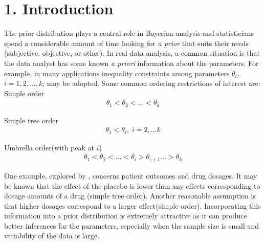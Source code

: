 \documentclass[Proceedings]{ascelike}
\begin{document}
\section{1. Introduction}
The prior distribution plays a central role in Bayesian analysis and
statisticians spend a considerable amount of time looking for \emph{a
  prior} that suits their needs (subjective, objective, or other). In
real data analysis, a common situation is that the data analyst has
some known \emph{a priori} information about the parameters. For
example, in many applications inequality constraints among parameters
$\theta_i$, $i = 1, 2, ..., k$, may be adopted. Some common ordering
restrictions of interest are:\\

Simple order
\begin{eqnarray}
\theta_1<\theta_2<...<\theta_k\nonumber
\end{eqnarray}

Simple tree order
\begin{eqnarray}
\theta_1<\theta_i,\;i=2,...k\nonumber
\end{eqnarray}

Umbrella order(with peak at $i$)
\begin{eqnarray}
\theta_1<\theta_2<...<\theta_i>\theta_{i+1}...>\theta_k\nonumber
\end{eqnarray}
% 

One example, explored by \cite{McDermott}, concerns patient outcomes
and drug dosages. It may be known that the effect of the placebo is
lower than any effects corresponding to dosage amounts of a drug
(simple tree order). Another reasonable assumption is that higher
dosages correspond to a larger effect(simple order). Incorporating
this information into a prior distribution is extremely attractive as
it can produce better inferences for the parameters, especially when
the sample size is small and variability of the data is large.
\end{document}

